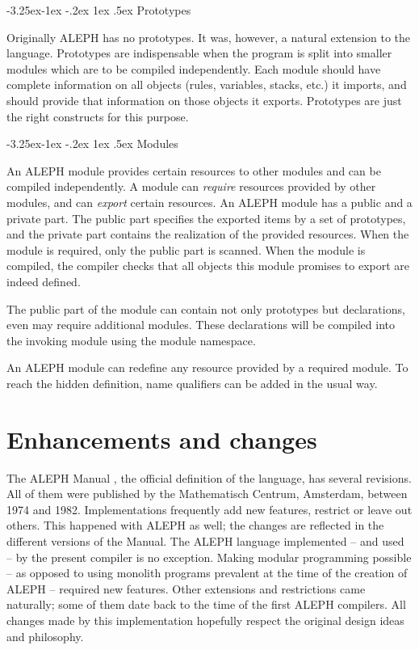 \documentclass{article}
\makeatletter
\newcommand\A{\textsf{ALEPH}}
\renewcommand\subsection{%
\@startsection{subsection}{2}{\z@}%
   {-3.25ex\@plus -1ex \@minus -.2ex}%
   {1ex \@plus .5ex}%
   {\normalfont\normalsize\bfseries}}
\makeatother
\begin{document}
\subsection{Prototypes}

Originally \A{} has no prototypes. It was, however, a natural extension to
the language. Prototypes are indispensable when the program is split into
smaller modules which are to be compiled independently. Each module should
have complete information on all objects (rules, variables, stacks, etc.) it
imports, and should provide that information on those objects it exports.
Prototypes are just the right constructs for this purpose.

\subsection{Modules}

An \A{} module provides certain resources to other modules and can be
compiled independently. A module can \emph{require} resources provided by other
modules, and can \emph{export} certain resources. An \A{} module has a
public and a private part. The public part specifies the exported items by a
set of prototypes, and the private part contains the realization of the
provided resources. When the module is required, only the public part is
scanned. When the module is compiled, the compiler checks that all objects
this module promises to export are indeed defined.

The public part of the module can contain not only prototypes but
declarations, even may require additional modules. These declarations will
be compiled into the invoking module using the module namespace.

An \A{} module can redefine any resource provided by a required module. To
reach the hidden definition, name qualifiers can be added in the usual way.


\section{Enhancements and changes}

The \A{} Manual \cite{A-manual}, the official definition of the language,
has several revisions. All of them were published by the Mathematisch
Centrum, Amsterdam, between 1974 and 1982. Implementations frequently add
new features, restrict or leave out others. This happened with \A{} as well;
the changes are reflected in the different versions of the Manual. The \A{}
language implemented -- and used -- by the present compiler is no exception.
Making modular programming possible -- as opposed to using monolith programs
prevalent at the time of the creation of \A{} -- required new features.
Other extensions and restrictions came naturally; some of them date back to
the time of the first \A{} compilers. All changes made by this
implementation hopefully respect the original design ideas and philosophy.
\end{document}
